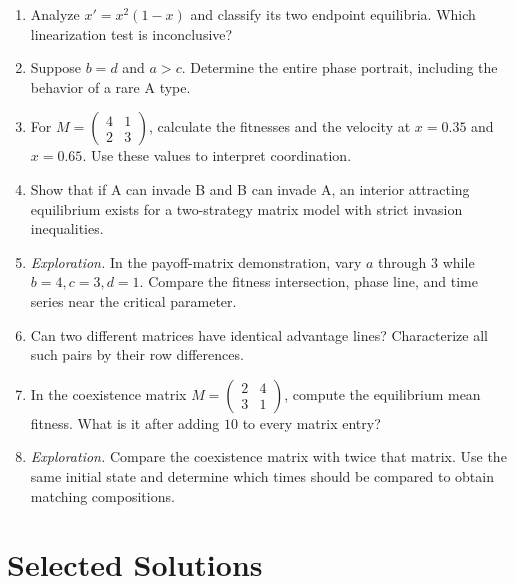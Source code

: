 \documentclass[11pt,oneside,openany]{book}
\theoremstyle{definition}
\theoremstyle{remark}
\newenvironment{exercises}{\begin{enumerate}[label=\thechapter.\arabic*,ref=\thechapter.\arabic*,leftmargin=2.8em,itemsep=6pt]}{\end{enumerate}}
\numberwithin{equation}{chapter}
\begin{document}
\begin{exercises}
\item Analyze $x'=x^2(1-x)$ and classify its two endpoint equilibria. Which linearization test is inconclusive?
\item Suppose $b=d$ and $a>c$. Determine the entire phase portrait, including the behavior of a rare A type.
\item For $M=\left(\begin{smallmatrix}4&1\\2&3\end{smallmatrix}\right)$, calculate the fitnesses and the velocity at $x=0.35$ and $x=0.65$. Use these values to interpret coordination.
\item Show that if A can invade B and B can invade A, an interior attracting equilibrium exists for a two-strategy matrix model with strict invasion inequalities.
\item \emph{Exploration.} In the payoff-matrix demonstration, vary $a$ through 3 while $b=4,c=3,d=1$. Compare the fitness intersection, phase line, and time series near the critical parameter.
\item Can two different matrices have identical advantage lines? Characterize all such pairs by their row differences.
\item In the coexistence matrix $M=\left(\begin{smallmatrix}2&4\\3&1\end{smallmatrix}\right)$, compute the equilibrium mean fitness. What is it after adding $10$ to every matrix entry?
\item \emph{Exploration.} Compare the coexistence matrix with twice that matrix. Use the same initial state and determine which times should be compared to obtain matching compositions.
\end{exercises}

\clearpage\backmatter
\chapter*{Selected Solutions}
\end{document}
